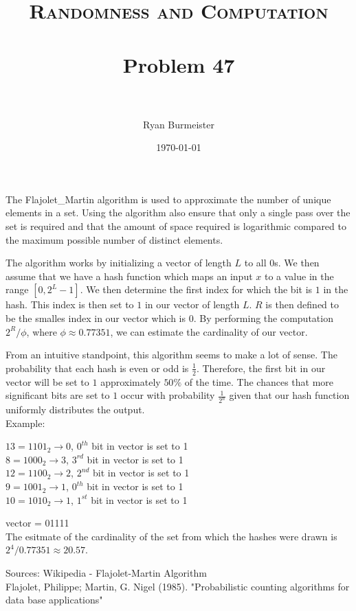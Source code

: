 \documentclass[fontsize=12pt]{article}
\title{ 
  \normalfont \normalsize 
  \textsc{Randomness and Computation} \\ [25pt] %
  \horrule{0.5pt} \\[0.4cm] %
  \huge Problem 47 \\ %
  \horrule{2pt} \\[0.5cm] %
}
\author{Ryan Burmeister} %
\date{\normalsize\today} %
\numberwithin{equation}{section} %
\numberwithin{figure}{section} %
\numberwithin{table}{section} %
\begin{document}
\maketitle %
The Flajolet\_Martin algorithm is used to approximate the number of unique
elements in a set.  Using the algorithm also ensure that only a single pass
over the set is required and that the amount of space required is logarithmic
compared to the maximum possible number of distinct elements.

The algorithm works by initializing a vector of length $L$ to all $0$s.  We
then assume that we have a hash function which maps an input $x$ to a value in
the range $\left[0,2^L-1\right]$.  We then determine the first index for which
the bit is $1$ in the hash.  This index is then set to $1$ in our vector of
length $L$.  $R$ is then defined to be the smalles index in our vector which is
$0$.  By performing the computation $2^R/\phi$, where $\phi\approx0.77351$, we
can estimate the cardinality of our vector.

From an intuitive standpoint, this algorithm seems to make a lot of sense.  The
probability that each hash is even or odd is $\frac{1}{2}$.  Therefore, the
first bit in our vector will be set to $1$ approximately $50\%$ of the time.
The chances that more significant bits are set to $1$ occur with probability
$\frac{1}{2^n}$ given that our hash function uniformly distributes the output. \\

Example: \\ \begin{center}
$13 = 1101_2 \rightarrow 0$, $0^{th}$ bit in vector is set to 1 \\
$8 = 1000_2 \rightarrow 3$, $3^{rd}$ bit in vector is set to 1 \\
$12 = 1100_2 \rightarrow 2$, $2^{nd}$ bit in vector is set to 1 \\
$9 = 1001_2 \rightarrow 1$, $0^{th}$ bit in vector is set to 1 \\
$10 = 1010_2 \rightarrow 1$, $1^{st}$ bit in vector is set to 1 \\
\end{center}
vector = 01111 \\
The esitmate of the cardinality of the set from which the hashes were drawn is
$2^4/0.77351 \approx 20.57$.

Sources:
Wikipedia - Flajolet-Martin Algorithm \\
Flajolet, Philippe; Martin, G. Nigel (1985). "Probabilistic counting algorithms for data base applications"
\end{document}
